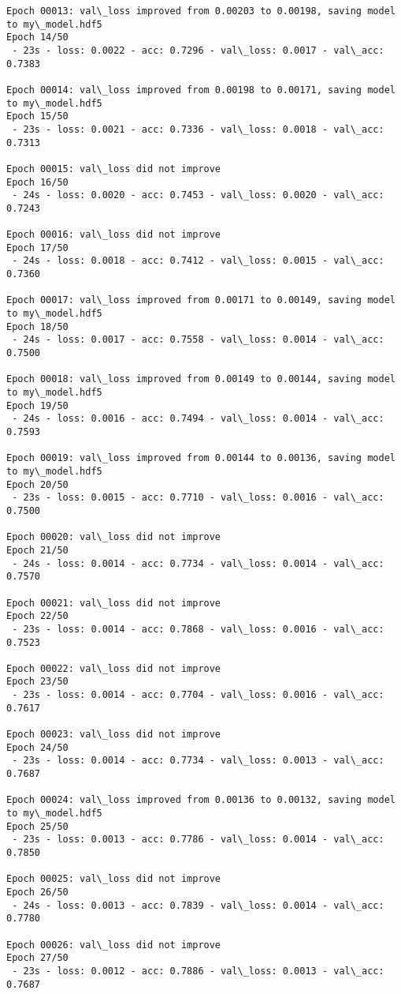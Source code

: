\documentclass[11pt]{article}
\begin{document}
\begin{Verbatim}[commandchars=\\\{\}]
Epoch 00013: val\_loss improved from 0.00203 to 0.00198, saving model to my\_model.hdf5
Epoch 14/50
 - 23s - loss: 0.0022 - acc: 0.7296 - val\_loss: 0.0017 - val\_acc: 0.7383

Epoch 00014: val\_loss improved from 0.00198 to 0.00171, saving model to my\_model.hdf5
Epoch 15/50
 - 23s - loss: 0.0021 - acc: 0.7336 - val\_loss: 0.0018 - val\_acc: 0.7313

Epoch 00015: val\_loss did not improve
Epoch 16/50
 - 24s - loss: 0.0020 - acc: 0.7453 - val\_loss: 0.0020 - val\_acc: 0.7243

Epoch 00016: val\_loss did not improve
Epoch 17/50
 - 24s - loss: 0.0018 - acc: 0.7412 - val\_loss: 0.0015 - val\_acc: 0.7360

Epoch 00017: val\_loss improved from 0.00171 to 0.00149, saving model to my\_model.hdf5
Epoch 18/50
 - 24s - loss: 0.0017 - acc: 0.7558 - val\_loss: 0.0014 - val\_acc: 0.7500

Epoch 00018: val\_loss improved from 0.00149 to 0.00144, saving model to my\_model.hdf5
Epoch 19/50
 - 24s - loss: 0.0016 - acc: 0.7494 - val\_loss: 0.0014 - val\_acc: 0.7593

Epoch 00019: val\_loss improved from 0.00144 to 0.00136, saving model to my\_model.hdf5
Epoch 20/50
 - 23s - loss: 0.0015 - acc: 0.7710 - val\_loss: 0.0016 - val\_acc: 0.7500

Epoch 00020: val\_loss did not improve
Epoch 21/50
 - 24s - loss: 0.0014 - acc: 0.7734 - val\_loss: 0.0014 - val\_acc: 0.7570

Epoch 00021: val\_loss did not improve
Epoch 22/50
 - 23s - loss: 0.0014 - acc: 0.7868 - val\_loss: 0.0016 - val\_acc: 0.7523

Epoch 00022: val\_loss did not improve
Epoch 23/50
 - 23s - loss: 0.0014 - acc: 0.7704 - val\_loss: 0.0016 - val\_acc: 0.7617

Epoch 00023: val\_loss did not improve
Epoch 24/50
 - 23s - loss: 0.0014 - acc: 0.7734 - val\_loss: 0.0013 - val\_acc: 0.7687

Epoch 00024: val\_loss improved from 0.00136 to 0.00132, saving model to my\_model.hdf5
Epoch 25/50
 - 23s - loss: 0.0013 - acc: 0.7786 - val\_loss: 0.0014 - val\_acc: 0.7850

Epoch 00025: val\_loss did not improve
Epoch 26/50
 - 24s - loss: 0.0013 - acc: 0.7839 - val\_loss: 0.0014 - val\_acc: 0.7780

Epoch 00026: val\_loss did not improve
Epoch 27/50
 - 23s - loss: 0.0012 - acc: 0.7886 - val\_loss: 0.0013 - val\_acc: 0.7687


\end{Verbatim}
\end{document}
